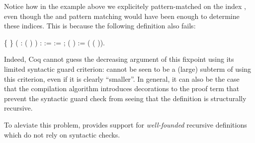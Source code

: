  Notice how in the  example above we explicitely pattern-matched
  on the index , even though the  and  pattern matching
  would have been enough to determine these indices. This is because the
  following definition also fails: \begin{coqdoccode}
\coqdocemptyline
\coqdocnoindent
{}   \{ \} ( :  (  ) ) :    :=\coqdoceol
\coqdocnoindent
{}  :=  ;\coqdoceol
\coqdocnoindent
{} (    ) :=\coqdoceol
\coqdocindent{1.00em}
  ( (  )).\coqdoceol
\coqdocemptyline
\end{coqdoccode}
Indeed, Coq cannot guess the decreasing argument of this fixpoint
    using its limited syntactic guard criterion:    cannot
    be seen to be a (large) subterm of  using this criterion, even
    if it is clearly ``smaller''. In general, it can also be the case that
    the compilation algorithm introduces decorations to the proof term
    that prevent the syntactic guard check from seeing that the
    definition is structurally recursive.


    To aleviate this problem,  provides support for
    \textit{well-founded} recursive definitions which do not rely on syntactic
    checks.


